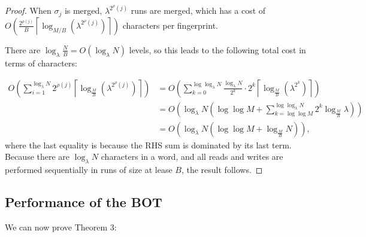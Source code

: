 \begin{proof}
	When $\sigma_j$ is merged, $\lambda^{2^\rho(j)}$ runs are merged, which has
	a cost of\\
	$O\left(\frac{2^{\rho(j)}}{B}\left\lceil\log_{M/B}\left(\lambda^{2^\rho(j)}\right)\right\rceil\right)$
	characters per fingerprint.

	There are $\log_\lambda \frac{N}{B} = O(\log_\lambda N)$ levels, so this leads to the
	following total cost in terms of characters:

	\begin{align*}
		O\left(\sum_{i=1}^{\log_\lambda N} 2^{\rho(j)}\left\lceil\log_{\frac{M}{B}}\left(\lambda^{2^\rho(j)}\right)\right\rceil\right)
		&= O\left(\sum_{k=0}^{\log \log_\lambda N} \frac{\log_\lambda N}{2^k} \cdot 2^k \left\lceil\log_{\frac{M}{B}}\left(\lambda^{2^k}\right)\right\rceil\right) \\
		&= O\left(\log_\lambda N \left(\log\log M + \sum_{k=\log\log M}^{\log \log_\lambda N} 2^k\log_{\frac{M}{B}}\lambda\right)\right) \\
		&= O\left(\log_\lambda N\left(\log\log M + \log_{\frac{M}{B}}N\right)\right),
	\end{align*}
	where the last equality is because the RHS sum is dominated by its last
	term. Because there are $\log_\lambda N$ characters in a word, and all
	reads and writes are performed sequentially in runs of size at lease $B$,
	the result follows.
\end{proof}

\subsection{Performance of the BOT}

We can now prove Theorem 3:

\botcost*

